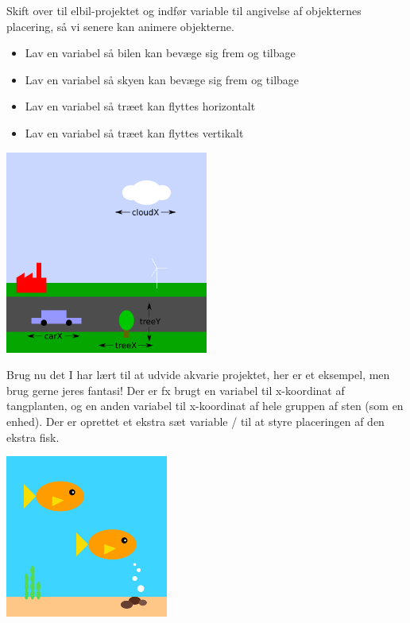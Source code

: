 \documentclass{ucph-handout}
\begin{document}
\begin{exercisebox}[adjusted title= Green City forstat]
Skift over til elbil-projektet og indfør variable til angivelse af
objekternes placering, så vi senere kan animere objekterne.

\begin{itemize}
\item Lav en variabel  så bilen kan bevæge sig frem
  og tilbage
\item Lav en variabel  så skyen kan bevæge sig frem og tilbage
\item Lav en variabel  så træet kan flyttes horizontalt
\item Lav en variabel  så træet kan flyttes vertikalt
\end{itemize}
\begin{center}
\includegraphics[width=0.5\textwidth]{illustrationer/carX-cloudX-treeXY.png}
\end{center}
\end{exercisebox}

\begin{exercisebox}[adjusted title=Akvarie fortsat]
Brug nu det I har lært til at udvide akvarie projektet, her er et
eksempel, men brug gerne jeres fantasi! Der er fx brugt en variabel
til x-koordinat af tangplanten, og en anden variabel til x-koordinat
af hele gruppen af sten (som en enhed). Der er oprettet et ekstra sæt
variable / til at styre placeringen af den
ekstra fisk.%

\begin{center}
\includegraphics[width=0.4\textwidth]{illustrationer/akvarie.png}
\end{center}

\end{exercisebox}
\end{document}
